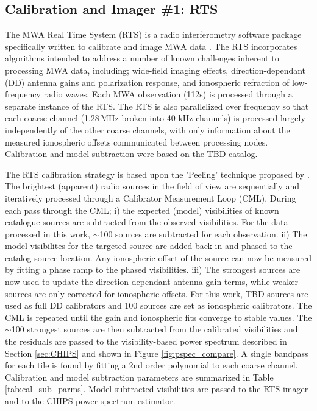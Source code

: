 \documentclass[preprint]{aastex}
\begin{document}
\subsection{Calibration and Imager \#1: RTS}
\label{sec:RTS}
The MWA Real Time System (RTS) is a radio interferometry software package specifically written to calibrate and image MWA data \citep[][Mitchell et al. in prep]{Ord:2010p7534}. The RTS incorporates algorithms intended to address a number of known challenges inherent to processing MWA data, including; wide-field imaging effects, direction-dependant (DD) antenna gains and polarization response, and ionospheric refraction of low-frequency radio waves. Each MWA observation (112s) is processed through a separate instance of the RTS. The RTS is also parallelized over frequency so that each coarse channel (1.28\,MHz broken into 40 kHz channels) is processed largely independently of the other coarse channels, with only information about the measured ionospheric offsets communicated between processing nodes.  Calibration and model subtraction were based on the TBD catalog. 

The RTS calibration strategy is based upon the 'Peeling' technique proposed by \cite{Noordam:2004p2379}. The brightest (apparent) radio sources in the field of view are sequentially and iteratively processed through a Calibrator Measurement Loop (CML). During each pass through the CML; i) the expected (model) visibilities of known catalogue sources are subtracted from the observed visibilities. For the data processed in this work, $\sim$100 sources are subtracted for each observation. ii) The model visibilites for the targeted source are added back in and phased to the catalog source location. Any ionospheric offset of the source can now be measured by fitting a phase ramp to the phased visibilities. iii) The strongest sources are now used to update the direction-dependant antenna gain terms, while weaker sources are only corrected for ionospheric offsets. For this work, TBD sources are used as full DD calibrators and 100 sources are set as ionospheric calibrators. The CML is repeated until the gain and ionospheric fits converge to stable values. The $\sim$100 strongest sources are then subtracted from the calibrated visibilities and the residuals are passed to the visibility-based power spectrum described in Section \ref{sec:CHIPS} and shown in Figure \ref{fig:pspec_compare}.  A single bandpass for each tile is found by fitting a 2nd order polynomial to each coarse channel. Calibration and model subtraction parameters are summarized in Table \ref{tab:cal_sub_parms}.  Model subtracted visibilities are passed to the RTS imager and to the CHIPS power spectrum estimator. %
\end{document}
